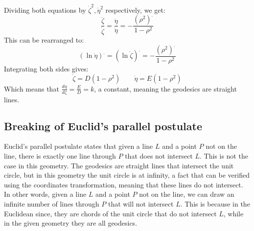\documentclass{article}
\begin{document}
Dividing both equations by $\dot{\zeta}^2, \dot{\eta}^2$ respectively, we get:
\begin{equation}
    \frac{\ddot{\zeta}}{\dot{\zeta}} = \frac{\ddot{\eta}}{\dot{\eta}} = -\frac{\left(\rho^2\right)^{.}}{1-\rho^2}
\end{equation}
This can be rearranged to:
\begin{equation}
    \left(\ln \dot{\eta}\right)^{.} = \left(\ln \dot{\zeta}\right)^{.} = -\frac{\left(\rho^2\right)^{.}}{1-\rho^2}
\end{equation}
Integrating both sides gives:
\begin{equation}
    \dot{\zeta} = D(1-\rho^2) \qquad \dot{\eta} = E(1-\rho^2)
\end{equation}
Which means that $\frac{d\eta}{d\zeta} = \frac{E}{D} = k$, a constant, meaning the geodesics are straight lines.
\subsection{Breaking of Euclid's parallel postulate}
Euclid's parallel postulate states that given a line $L$ and a point $P$ not on the line, there is exactly one line through $P$ that does not intersect $L$. This is not the case in this geometry. The geodesics are straight lines that intersect the unit circle, but in this geometry the unit circle is at infinity, a fact that can be verified using the coordinates transformation, meaning that these lines do not intersect.
\newline
In other words, given a line $L$ and a point $P$ not on the line, we can draw an infinite number of lines through $P$ that will not intersect $L$. This is because in the Euclidean since, they are chords of the unit circle that do not intersect $L$, while in the given geometry they are all geodesics.
\end{document}
